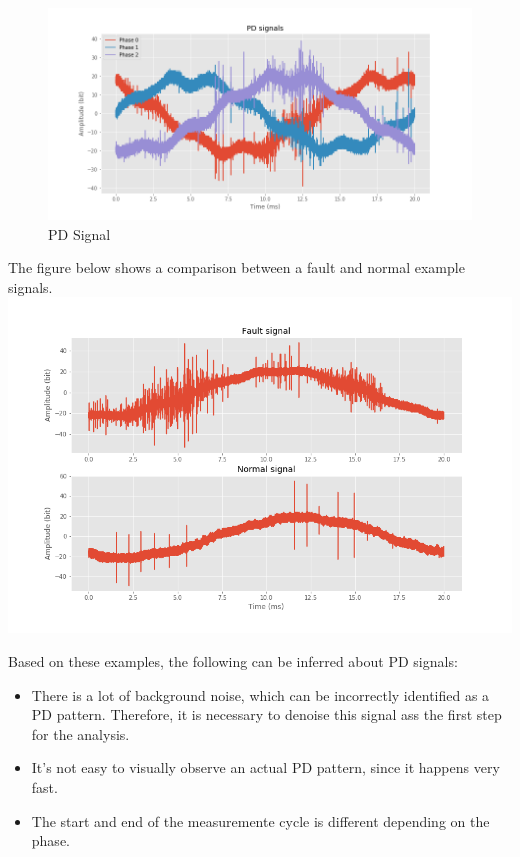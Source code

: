 \documentclass[11pt]{article}
\makeatletter
\def\maxwidth{\ifdim\Gin@nat@width>\linewidth\linewidth
    \else\Gin@nat@width\fi}
\let\Oldincludegraphics\includegraphics
\renewcommand{\includegraphics}[1]{\Oldincludegraphics[width=.8\maxwidth]{#1}}
\providecommand{\tightlist}{%
      \setlength{\itemsep}{0pt}\setlength{\parskip}{0pt}}
\makeatother
\begin{document}
\begin{figure}
\centering
\includegraphics{signal_phase_example.png}
\caption{PD Signal}
\end{figure}

The figure below shows a comparison between a fault and normal example
signals. \includegraphics{signal_fault_normal_raw.png}

Based on these examples, the following can be inferred about PD signals:

\begin{itemize}
\tightlist
\item
  There is a lot of background noise, which can be incorrectly
  identified as a PD pattern. Therefore, it is necessary to denoise this
  signal ass the first step for the analysis.
\item
  It's not easy to visually observe an actual PD pattern, since it
  happens very fast.
\item
  The start and end of the measuremente cycle is different depending on
  the phase.
\end{itemize}
\end{document}
